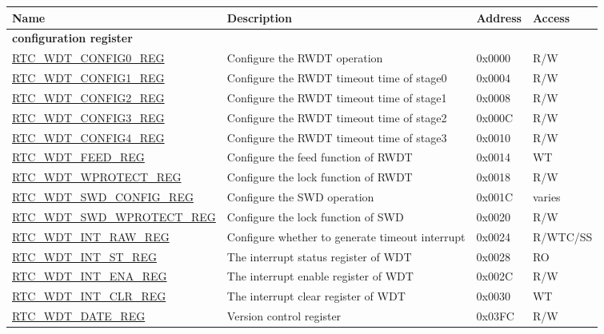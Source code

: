 \begin{longtable}{ | p{6cm} | p{7.2cm} | p{1.3cm} | p{1cm} | }
\hline\rowcolor{lightgray}
\textbf{Name} & \textbf{Description} &  \textbf{Address} & \textbf{Access} \\ \hline
\endhead
\multicolumn{4}{|l|}{\textbf{configuration register}} \\ \hline
\hyperref[regdesc:RTCWDTCONFIG0REG]{RTC\_WDT\_CONFIG0\_REG} & Configure the RWDT operation & 0x0000 & R/W \\ \hline
\hyperref[regdesc:RTCWDTCONFIG1REG]{RTC\_WDT\_CONFIG1\_REG} & Configure the RWDT timeout time of stage0 & 0x0004 & R/W \\ \hline
\hyperref[regdesc:RTCWDTCONFIG2REG]{RTC\_WDT\_CONFIG2\_REG} & Configure the RWDT timeout time of stage1 & 0x0008 & R/W \\ \hline
\hyperref[regdesc:RTCWDTCONFIG3REG]{RTC\_WDT\_CONFIG3\_REG} & Configure the RWDT timeout time of stage2 & 0x000C & R/W \\ \hline
\hyperref[regdesc:RTCWDTCONFIG4REG]{RTC\_WDT\_CONFIG4\_REG} & Configure the RWDT timeout time of stage3 & 0x0010 & R/W \\ \hline
\hyperref[regdesc:RTCWDTFEEDREG]{RTC\_WDT\_FEED\_REG} & Configure the feed function of RWDT & 0x0014 & WT \\ \hline
\hyperref[regdesc:RTCWDTWPROTECTREG]{RTC\_WDT\_WPROTECT\_REG} & Configure the lock function of RWDT & 0x0018 & R/W \\ \hline
\hyperref[regdesc:RTCWDTSWDCONFIGREG]{RTC\_WDT\_SWD\_CONFIG\_REG} & Configure the SWD operation & 0x001C & varies \\ \hline
\hyperref[regdesc:RTCWDTSWDWPROTECTREG]{RTC\_WDT\_SWD\_WPROTECT\_REG} & Configure the lock function of SWD & 0x0020 & R/W \\ \hline
\hyperref[regdesc:RTCWDTINTRAWREG]{RTC\_WDT\_INT\_RAW\_REG} & Configure whether to generate timeout interrupt & 0x0024 & R/WTC/SS \\ \hline
\hyperref[regdesc:RTCWDTINTSTREG]{RTC\_WDT\_INT\_ST\_REG} & The interrupt status register of WDT & 0x0028 & RO \\ \hline
\hyperref[regdesc:RTCWDTINTENAREG]{RTC\_WDT\_INT\_ENA\_REG} & The interrupt enable register of WDT & 0x002C & R/W \\ \hline
\hyperref[regdesc:RTCWDTINTCLRREG]{RTC\_WDT\_INT\_CLR\_REG} & The interrupt clear register of WDT & 0x0030 & WT \\ \hline
\hyperref[regdesc:RTCWDTDATEREG]{RTC\_WDT\_DATE\_REG} & Version control register & 0x03FC & R/W \\ \hline
\end{longtable}
